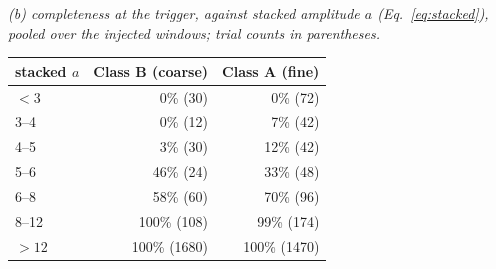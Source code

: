 \smallskip
\emph{(b) completeness at the trigger, against stacked amplitude $a$
(Eq.~\ref{eq:stacked}), pooled over the \CompWin{} injected windows;
trial counts in parentheses.}\\[2pt]
\label{tab:compcurve}
\begin{tabular}{@{}lrr@{}}
\toprule
stacked $a$ & Class B (coarse) & Class A (fine) \\
\midrule
$<3$ & 0\% (30) & 0\% (72) \\
3--4 & 0\% (12) & 7\% (42) \\
4--5 & 3\% (30) & 12\% (42) \\
5--6 & 46\% (24) & 33\% (48) \\
6--8 & 58\% (60) & 70\% (96) \\
8--12 & 100\% (108) & 99\% (174) \\
$>12$ & 100\% (1680) & 100\% (1470) \\
\bottomrule
\end{tabular}
